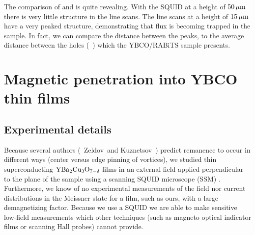 %
%

%
%
The comparison of  and 
 is quite revealing. With the SQUID
at a height of $50\,\mu\mathrm{m}$ there is very little structure in the
line scans. The line scans at a height of $15\,\mu\mathrm{m}$ have a 
very peaked structure, demonstrating that flux is becoming trapped
in the sample. In fact, we can compare the distance between the peaks,
to the average distance between the holes (\cf\ )
which the YBCO/RABiTS sample presents. 

\section{Magnetic penetration into YBCO thin films}
\label{sec:magpen_ybco}

\subsection{Experimental details}
\label{sec:magpen_exp_details}
%
%
Because several authors (\cf\ Zeldov\etal\,\cite{zeldov_prl_73_1428_1994}
and Kuznetsov \etal\,\cite{kuznetsov_prb_59_1507_1999}) predict
remanence to occur in different ways (center versus edge pinning
of vortices),
we studied thin superconducting $\mathrm{YBa}_2\mathrm{Cu}_3\mathrm{O}_{7-\delta}$ films
in an external field applied perpendicular to the
plane of the sample using a scanning SQUID microscope 
(SSM) \cite{black_apl_62_2128_1993}.
Furthermore, we know of no experimental measurements of
the field nor current distributions in the Meissner state for
a film, such as ours, with a large demagnetizing factor. Because
we use a SQUID we are able to make sensitive low-field measurements which
other techniques (such as magneto optical indicator films or 
scanning Hall
probes) cannot provide. 

